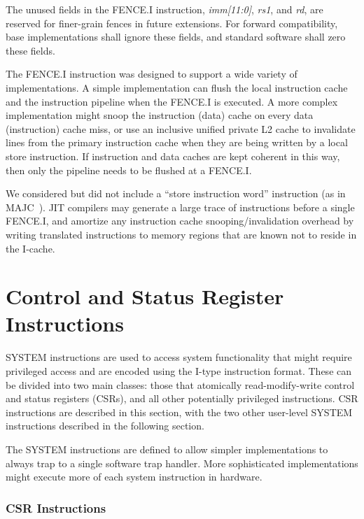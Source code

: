 The unused fields in the FENCE.I instruction, {\em imm[11:0]}, {\em rs1}, and
{\em rd}, are reserved for finer-grain fences in future extensions.  For
forward compatibility, base implementations shall ignore these fields, and
standard software shall zero these fields.

\begin{commentary}
The FENCE.I instruction was designed to support a wide variety of
implementations.  A simple implementation can flush the local
instruction cache and the instruction pipeline when the FENCE.I is
executed.  A more complex implementation might snoop the instruction
(data) cache on every data (instruction) cache miss, or use an
inclusive unified private L2 cache to invalidate lines from the
primary instruction cache when they are being written by a local store
instruction.  If instruction and data caches are kept coherent in this
way, then only the pipeline needs to be flushed at a FENCE.I.

We considered but did not include a ``store instruction word''
instruction (as in MAJC~\cite{majc}).  JIT compilers may generate a
large trace of instructions before a single FENCE.I, and amortize any
instruction cache snooping/invalidation overhead by writing translated
instructions to memory regions that are known not to reside in the
I-cache.
\end{commentary}

\section{Control and Status Register Instructions}

SYSTEM instructions are used to access system functionality that might
require privileged access and are encoded using the I-type instruction
format.  These can be divided into two main classes: those that
atomically read-modify-write control and status registers (CSRs), and
all other potentially privileged instructions. CSR instructions are
described in this section, with the two other user-level SYSTEM
instructions described in the following section.

\begin{commentary}
The SYSTEM instructions are defined to allow simpler implementations
to always trap to a single software trap handler.  More sophisticated
implementations might execute more of each system instruction in
hardware.
\end{commentary}

\subsubsection*{CSR Instructions}

